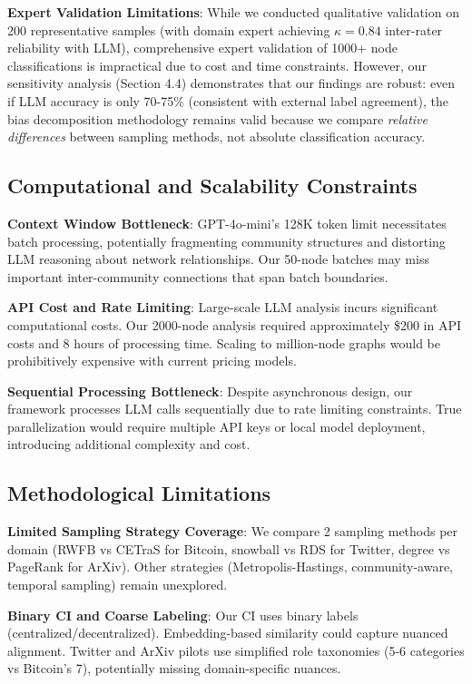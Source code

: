 \documentclass[conference]{IEEEtran}
\begin{document}
\textbf{Expert Validation Limitations}: While we conducted qualitative validation on 200 representative samples (with domain expert achieving $\kappa = 0.84$ inter-rater reliability with LLM), comprehensive expert validation of 1000+ node classifications is impractical due to cost and time constraints. However, our sensitivity analysis (Section 4.4) demonstrates that our findings are robust: even if LLM accuracy is only 70-75\% (consistent with external label agreement), the bias decomposition methodology remains valid because we compare \textit{relative differences} between sampling methods, not absolute classification accuracy.

\subsection{Computational and Scalability Constraints}

\textbf{Context Window Bottleneck}: GPT-4o-mini's 128K token limit necessitates batch processing, potentially fragmenting community structures and distorting LLM reasoning about network relationships. Our 50-node batches may miss important inter-community connections that span batch boundaries.

\textbf{API Cost and Rate Limiting}: Large-scale LLM analysis incurs significant computational costs. Our 2000-node analysis required approximately \$200 in API costs and 8 hours of processing time. Scaling to million-node graphs would be prohibitively expensive with current pricing models.

\textbf{Sequential Processing Bottleneck}: Despite asynchronous design, our framework processes LLM calls sequentially due to rate limiting constraints. True parallelization would require multiple API keys or local model deployment, introducing additional complexity and cost.

\subsection{Methodological Limitations}

\textbf{Limited Sampling Strategy Coverage}: We compare 2 sampling methods per domain (RWFB vs CETraS for Bitcoin, snowball vs RDS for Twitter, degree vs PageRank for ArXiv). Other strategies (Metropolis-Hastings, community-aware, temporal sampling) remain unexplored.

\textbf{Binary CI and Coarse Labeling}: Our CI uses binary labels (centralized/decentralized). Embedding-based similarity could capture nuanced alignment. Twitter and ArXiv pilots use simplified role taxonomies (5-6 categories vs Bitcoin's 7), potentially missing domain-specific nuances.
\end{document}

